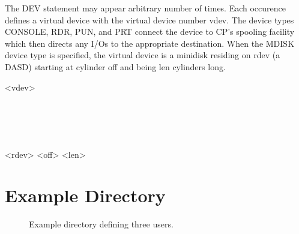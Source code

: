 The DEV statement may appear arbitrary number of times.  Each occurence
defines a virtual device with the virtual device number vdev.  The device
types CONSOLE, RDR, PUN, and PRT connect the device to CP's spooling
facility which then directs any I/Os to the appropriate destination.  When
the MDISK device type is specified, the virtual device is a minidisk
residing on rdev (a DASD) starting at cylinder off and being len cylinders
long.

\begin{syntdiag}
 <vdev>
\begin{stack}
	 \\
	 \\
	 \\
	 \\
	 <rdev> <off> <len>
\end{stack}
\end{syntdiag}

\section{Example Directory}
\begin{figure*}[htb]
\small

\captionfont
\caption{\capfont Example directory defining three users.}
\label{fig:directory-sample}
\end{figure*}

